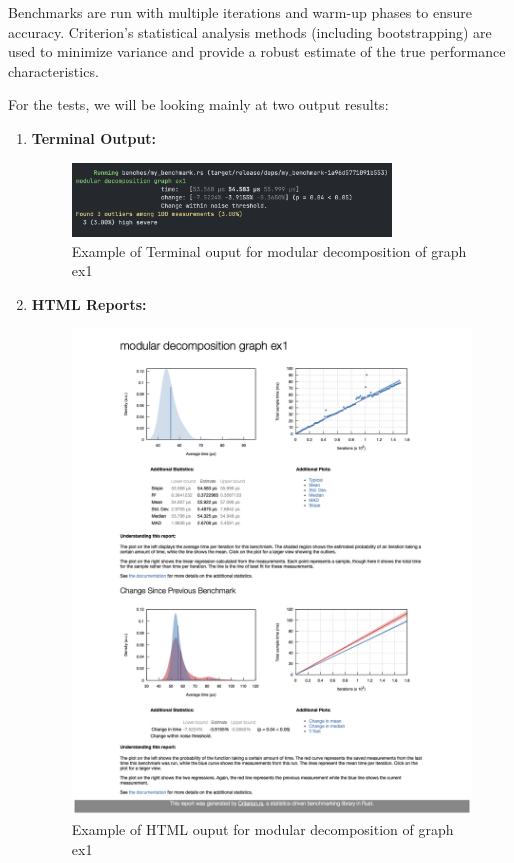 Benchmarks are run with multiple iterations and warm-up phases to ensure accuracy.
Criterion’s statistical analysis methods (including bootstrapping) are used to minimize variance and provide a robust estimate of the true performance characteristics.

\begin{myex}
    For the tests, we will be looking mainly at two output results:
    \begin{enumerate}
        \item \textbf{Terminal Output:}
                \begin{figure}[!h]
                    \centering
                    \includegraphics[width=0.80\textwidth]{images/benchmark/benchmark-terminal-output}
                    \caption{Example of Terminal ouput for modular decomposition of graph ex1}
                    \label{fig:example-of-terminal-output}
                \end{figure}
        \item \textbf{HTML Reports:}
        \begin{figure}[!h]
            \centering
            \includegraphics[width=1\textwidth]{images/benchmark/benchmark-html-output}
            \caption{Example of HTML ouput for modular decomposition of graph ex1}
            \label{fig:example-of-html-output}
        \end{figure}
    \end{enumerate}
\end{myex}



